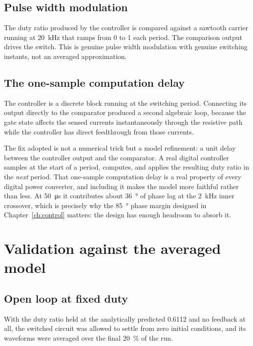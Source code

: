 \subsection{Pulse width modulation}

The duty ratio produced by the controller is compared against a sawtooth carrier
running at \SI{20}{\kilo\hertz} that ramps from \num{0} to \num{1} each period.
The comparison output drives the switch. This is genuine pulse width modulation
with genuine switching instants, not an averaged approximation.

\subsection{The one-sample computation delay}

The controller is a discrete block running at the switching period. Connecting
its output directly to the comparator produced a second algebraic loop, because
the gate state affects the sensed currents instantaneously through the resistive
path while the controller has direct feedthrough from those currents.

The fix adopted is not a numerical trick but a model refinement: a unit delay
between the controller output and the comparator. A real digital controller
samples at the start of a period, computes, and applies the resulting duty ratio
in the \emph{next} period. That one-sample computation delay is a real property
of every digital power converter, and including it makes the model more faithful
rather than less. At \SI{50}{\micro\second} it contributes about
\SI{36}{\degree} of phase lag at the \SI{2}{\kilo\hertz} inner crossover, which
is precisely why the \SI{85}{\degree} phase margin designed in
Chapter~\ref{ch:control} matters: the design has enough headroom to absorb it.

\section{Validation against the averaged model}

\subsection{Open loop at fixed duty}

With the duty ratio held at the analytically predicted \num{0.6112} and no
feedback at all, the switched circuit was allowed to settle from zero initial
conditions, and its waveforms were averaged over the final \SI{20}{\percent} of
the run.


